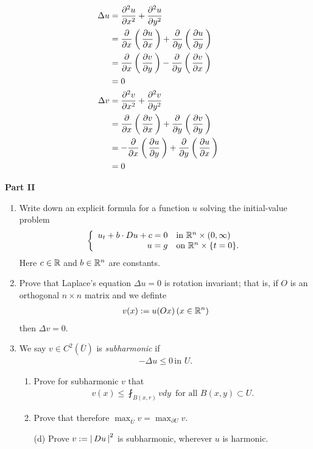 \documentclass[10pt,a4paper]{report}
\newcommand{\BLUE}[1]{\textcolor{blue}{#1}}
\begin{document}
\begin{description}
\begin{enumerate}
		\BLUE{
		\begin{align*}
			\Delta u &= \frac{\partial^2 u}{\partial x^2}+ \frac{\partial^2 u}{\partial y^2} \\
			&= \frac{\partial }{\partial x}\left (\, \frac{\partial u}{\partial x} \,\right )+\frac{\partial }{\partial y}\left (\, \frac{\partial u}{\partial y} \,\right ) \\
			&= \frac{\partial }{\partial x}\left (\, \frac{\partial v}{\partial y} \,\right )-\frac{\partial }{\partial y}\left (\, \frac{\partial v}{\partial x} \,\right )\\
			&= 0 \\
			\Delta v &= \frac{\partial^2 v}{\partial x^2}+ \frac{\partial^2 v}{\partial y^2} \\
			&= \frac{\partial }{\partial x}\left (\, \frac{\partial v}{\partial x} \,\right )+\frac{\partial }{\partial y}\left (\, \frac{\partial v}{\partial y} \,\right ) \\
			&= -\frac{\partial }{\partial x}\left (\, \frac{\partial u}{\partial y} \,\right )+\frac{\partial }{\partial y}\left (\, \frac{\partial u}{\partial x} \,\right )\\
			&= 0 
		\end{align*}
		}
		
	\end{enumerate}
	
	\item \textbf{Part II}
	\begin{enumerate}
		\item Write down an explicit formula for a function $u$ solving the initial-value problem
		\begin{align*}
			\left \{ \begin{array}{rl}
				u_t+b\cdot Du+c=0 & \text{in } \mathbb{R}^n\times (0,\infty)\\
				u=g & \text{on } \mathbb{R}^n\times \{t=0\}.
			\end{array}
			 \right .
		\end{align*}Here $c \in \mathbb{R}$ and $b\in\mathbb{R}^n$ are constants.
		\item Prove that Laplace's equation $\Delta u=0$ is rotation invariant; that is, if $O$ is an orthogonal $n \times n$ matrix and we definte
		\begin{align*}
			v(x) := u(Ox) \, (x \in \mathbb{R}^n)
		\end{align*}then $\Delta v=0$.
		\setcounter{enumi}{4}
		\item We say $v \in C^2(\bar{U})$ is \textit{subharmonic} if
		\begin{align*}
			-\Delta u \le 0\, \text{in } U.
		\end{align*}
		\begin{enumerate}[label=(\alph*)]
			\item Prove for subharmonic $v$ that
			\begin{align*}
				v(x) \le \fint_{B(x,r)} v dy \, \text{ for all } B(x,y) \subset U.
			\end{align*}
			\item Prove that therefore $\max_{\bar{U}} v = \max_{\partial U} v$.
			\item[(d)] Prove $v := \left |\, Du \,\right |^2$ is subharmonic, wherever $u$ is harmonic.
		
		\end{enumerate}
	\end{enumerate}
\end{description}
\end{document}
